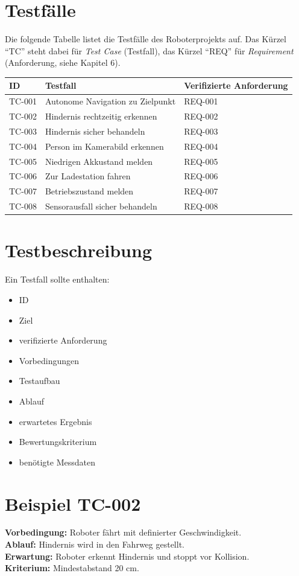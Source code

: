 \section{Testfälle}
Die folgende Tabelle listet die Testfälle des Roboterprojekts auf. Das Kürzel \enquote{TC} steht dabei für \emph{Test Case} (Testfall), das Kürzel \enquote{REQ} für \emph{Requirement} (Anforderung, siehe Kapitel 6).

\begin{longtable}{p{}p{}p{}}
\toprule
ID & Testfall & Verifizierte Anforderung\\
\midrule
TC-001 & Autonome Navigation zu Zielpunkt & REQ-001\\
TC-002 & Hindernis rechtzeitig erkennen & REQ-002\\
TC-003 & Hindernis sicher behandeln & REQ-003\\
TC-004 & Person im Kamerabild erkennen & REQ-004\\
TC-005 & Niedrigen Akkustand melden & REQ-005\\
TC-006 & Zur Ladestation fahren & REQ-006\\
TC-007 & Betriebszustand melden & REQ-007\\
TC-008 & Sensorausfall sicher behandeln & REQ-008\\
\bottomrule
\end{longtable}

\section{Testbeschreibung}
Ein Testfall sollte enthalten:

\begin{itemize}
    \item ID
    \item Ziel
    \item verifizierte Anforderung
    \item Vorbedingungen
    \item Testaufbau
    \item Ablauf
    \item erwartetes Ergebnis
    \item Bewertungskriterium
    \item benötigte Messdaten
\end{itemize}

\section{Beispiel TC-002}
\textbf{Vorbedingung:} Roboter fährt mit definierter Geschwindigkeit.\\
\textbf{Ablauf:} Hindernis wird in den Fahrweg gestellt.\\
\textbf{Erwartung:} Roboter erkennt Hindernis und stoppt vor Kollision.\\
\textbf{Kriterium:} Mindestabstand 20 cm.

